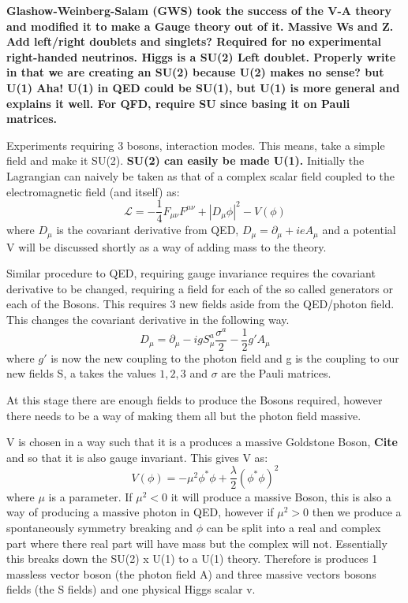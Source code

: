\textbf{Glashow-Weinberg-Salam (GWS) took the success of the V-A theory and modified it to make a Gauge theory out of it. Massive Ws and Z. Add left/right doublets and singlets? Required for no experimental right-handed neutrinos. Higgs is a SU(2) Left doublet. Properly write in that we are creating an SU(2) because U(2) makes no sense? but U(1) Aha! U(1) in QED could be SU(1), but U(1) is more general and explains it well. For QFD, require SU since basing it on Pauli matrices.}

Experiments requiring 3 bosons, interaction modes. This means, take a simple field and make it SU(2). \textbf{SU(2) can easily be made U(1).} Initially the Lagrangian can naively be taken as that of a complex scalar field coupled to the electromagnetic field (and itself) as:
\begin{equation}
\mathcal{L} = - \frac{1}{4} F_{\mu\nu}F^{\mu\nu} + |D_\mu \phi |^2  -V(\phi)
\end{equation}
where $D_\mu$ is the covariant derivative from QED, $D_\mu = \partial_\mu +ieA_\mu$ and a potential V will be discussed shortly as a way of adding mass to the theory.

Similar procedure to QED, requiring gauge invariance requires the covariant derivative to be changed, requiring a field for each of the so called generators or each of the Bosons. This requires 3 new fields aside from the QED/photon field. This changes the covariant derivative in the following way.
\begin{equation}
D_\mu = \partial_\mu - ig S^a_\mu \frac{\sigma^a}{2} - \frac{1}{2}g' A_\mu
\end{equation}
where $g'$ is now the new coupling to the photon field and g is the coupling to our new fields S, a takes the values ${1,2,3}$ and $\sigma$ are the Pauli matrices.

At this stage there are enough fields to produce the Bosons required, however there needs to be a way of making them all but the photon field massive.

V is chosen in a way such that it is a produces a massive Goldstone Boson, \textbf{Cite} and so that it is also gauge invariant. This gives V as:
\begin{equation}
V(\phi) = - \mu^2 \phi^{*}\phi + \frac{\lambda}{2}(\phi^{*}\phi)^2
\end{equation}
where $\mu$ is a parameter.
If $\mu^2 <0$ it will produce a massive Boson, this is also a way of producing a massive photon in QED, however if $\mu^2 >0$ then we produce a  spontaneously symmetry breaking and $\phi$ can be split into a real and complex part where there real part will have mass but the complex will not. Essentially this breaks down the SU(2) x U(1) to a U(1) theory. Therefore is produces 1 massless vector boson (the photon field A) and three massive vectors bosons fields (the S fields) and one physical Higgs scalar v. 


